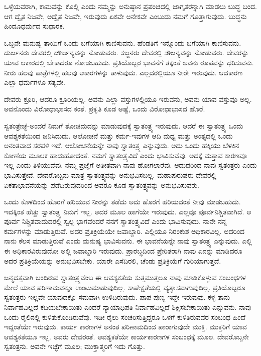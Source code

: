 ಒಳ್ಳೆಯವರಾಗಿ, ಕಾಮವನ್ನು ಕೊಲ್ಲಿ ಎಂದು ನಮ್ಮನ್ನು ಅನುಷ್ಠಾನ ಪ್ರಪಂಚದಲ್ಲಿ ಜಾಗೃತರನ್ನಾಗಿ ಮಾಡಲು ಬುದ್ಧ ಬಂದ. ಆಗ ದ್ವೈತ ನಿಜವೇ, ಅದ್ವೈತ ನಿಜವೇ, ಇರುವುದು ಏಕವೇ ಅನೇಕವೇ ಎಂಬುದು ನಮಗೆ ಗೊತ್ತಾಗುವುದು. ಬುದ್ಧನು ಹಿಂದೂಧರ್ಮದ ಸುಧಾರಕ.

ಒಬ್ಬನೇ ಮನುಷ್ಯ ತಾಯಿಗೆ ಒಂದು ಬಗೆಯಾಗಿ ಕಾಣಿಸುವನು. ಹೆಂಡತಿಗೆ ಇನ್ನೊಂದು ಬಗೆಯಾಗಿ ಕಾಣಿಸುವನು. ದುರ್ಜನರು ದೇವರಲ್ಲಿ ದೌರ್ಜನ್ಯವನ್ನು ನೋಡುವರು. ಸಜ್ಜನರು ದೇವರಲ್ಲಿ ಸೌಜನ್ಯವನ್ನು ನೋಡುವರು. ದೇವರನ್ನು ಯಾವ ಆಕಾರದಲ್ಲಿ ಬೇಕಾದರೂ ನೋಡಬಹುದು. ಪ್ರತಿಯೊಬ್ಬರ ಭಾವನೆಗೆ ತಕ್ಕಂತೆ ಅವನು ರೂಪವನ್ನು ಧರಿಸುವನು. ನೀರು ಹಲವು ಪಾತ್ರೆಗಳಲ್ಲಿ ಹಲವು ಆಕಾರಗಳನ್ನು ತಾಳುವುದು. ಎಲ್ಲದರಲ್ಲಿಯೂ ನೀರೇ ಇರುವುದು. ಆದಕಾರಣ ಎಲ್ಲಾ ಧರ್ಮಗಳೂ ಸತ್ಯವೇ.

ದೇವರು ಕ್ರೂರಿ, ಆದರೂ ಕ್ರೂರಿಯಲ್ಲ. ಅವನು ಎಲ್ಲಾ ವಸ್ತುಗಳಲ್ಲಿಯೂ ಇರುವನು, ಅವನು ಯಾವ ವಸ್ತುವೂ ಅಲ್ಲ. ಅವನೊಂದು ವಿರೋಧಾಭಾಸದ ಕಂತೆ. ಪ್ರಕೃತಿ ಕೂಡ ಅಷ್ಟೆ, ಒಂದು ವಿರೋಧಾಭಾಸದ ಹೊರೆ.

ಸ್ವತಂತ್ರೇಚ್ಛೆ-ಅಂದರೆ ನಿಮಗೆ ತೋಚಿದುದನ್ನು ಮಾಡುವುದಕ್ಕೆ ಸ್ವಾತಂತ್ರ್ಯ ಇರುವುದು. ಆದರೆ ಈ ಸ್ವಾತಂತ್ರ್ಯ ಒಂದು ಆವಶ್ಯಕತೆಯಿಂದ ಜನಿಸಿದುದು. ಆಲೋಚನೆ ಮತ್ತು ಕರ್ಮ-ಇವುಗಳ ಆದಿ ಮಧ್ಯ ಮತ್ತು ಅಂತ್ಯದಲ್ಲಿ ಒಂದು ಅನಂತವಾದ ಸರಪಳಿ ಇದೆ. ಆಲೋಚನೆಯನ್ನೇ ನಾವು ಸ್ವಾತಂತ್ರ್ಯ ಎನ್ನುವುದು. ಅದು ಒಂದು ಹಕ್ಕಿಯು ಬೆಳಕಿನ ಕೋಣೆಯ ಮೂಲಕ ಹಾದುಹೋದಂತೆ. ನಮಗೆ ಸ್ವಾತಂತ್ರ್ಯವಿದೆ ಎಂದು ಭಾವಿಸುವೆವು. ಅದಕ್ಕೆ ಮತ್ತಾವ ಕಾರಣವೂ ಇಲ್ಲ ಎಂದು ತಿಳಿಯುವೆವು. ನಮ್ಮ ಪ್ರಜ್ಞೆಗೆ ಅತೀತವಾಗಿ ನಾವು ಹೋಗಲಾರೆವು. ಆದುದರಿಂದ ನಾವು ಸ್ವತಂತ್ರರು ಎಂದು ಭಾವಿಸುತ್ತೇವೆ. ದೇವರೊಬ್ಬನು ಮಾತ್ರ ಸ್ವಾತಂತ್ರ್ಯವನ್ನು ಅನುಭವಿಸಬಲ್ಲ. ಮಹಾಪುರುಷರು ದೇವರಲ್ಲಿ ಏಕತಾಭಾವನೆಯನ್ನು ಪಡೆದಿರುವುದರಿಂದ ಅವರೂ ಕೂಡ ಸ್ವಾತಂತ್ರ್ಯವನ್ನು ಅನುಭವಿಸುವರು.

ಒಂದು ಕೊಳದಿಂದ ಹೊರಗೆ ಹರಿಯುವ ನೀರನ್ನು ತಡೆದು ಅದು ಹೊರಗೆ ಹರಿಯದಂತೆ ನೀವು ಮಾಡಬಹುದು. ಇದಕ್ಕಿಂತ ಹೆಚ್ಚು ಸ್ವಾತಂತ್ರ್ಯ ನಿಮಗೆ ಇಲ್ಲ. ಅದರ ಮೂಲ ಹಾಗೆಯೇ ಇರುವುದು. ಎಲ್ಲವೂ ಪೂರ್ವನಿಶ್ಚಿತವಾಗಿದೆ. ಆ ಪೂರ್ವ ನಿಶ್ಚಿತವಾದುದರಲ್ಲಿ ಸ್ವಲ್ಪ ಭಾಗವೆಂದರೆ ನನಗೆ ಸ್ವಾತಂತ್ರ್ಯವಿದೆ ಎಂದು ಭಾವಿಸುವುದು. ನಾನೇ ನನ್ನ ಕರ್ಮಗಳನ್ನು ಮಾಡುತ್ತಿರುವೆ. ಅದರ ಪ್ರತಿಕ್ರಿಯೆಯೇ ಜವಾಬ್ದಾರಿ. ಎಲ್ಲಿಯೂ ನಿರಂಕುಶ ಅಧಿಕಾರವಿಲ್ಲ. ಅದರಿಂದ ನಾನು ಕೆಲಸ ಮಾಡುತ್ತಿರುವೆ ಎಂದು ಮನುಷ್ಯ ಭಾವಿಸುವನು. ಈ ಭಾವನೆಯನ್ನೇ ನಾವು ಸ್ವಾತಂತ್ರ್ಯ ಎನ್ನುವುದು. ಎಲ್ಲಿ ಈ ಅಧಿಕಾರವಿರುವುದೋ ಅಲ್ಲಿ ಜವಾಬ್ದಾರಿ ಇರುವುದು. ಪ್ರಾರಬ್ಧದಿಂದ ಪ್ರೇರಿತರಾಗಿ ನಾವು ಏನನ್ನು ಮಾಡಿದರೂ ಅದರ ಪ್ರತಿಕ್ರಿಯೆಯನ್ನು ಅನುಭವಿಸಬೇಕು. ಯಾರೇ ಎಸೆದಿರಲಿ, ಚೆಂಡು ಪ್ರತಿಕ್ರಿಯೆಗೆ ಗುರಿಯಾಗುತ್ತದೆ.

ಜನ್ಮದತ್ತವಾಗಿ ಬಂದಿರುವ ಸ್ವಾತಂತ್ರ್ಯವೆಂಬ ಈ ಆವಶ್ಯಕತೆಯ ಸುತ್ತಮುತ್ತಲೂ ನಾವು ಮಾಡಿಕೊಳ್ಳುವ ಸಂಬಂಧಗಳ ಮೇಲೆ ಯಾವ ಪರಿಣಾಮವನ್ನೂ ಉಂಟುಮಾಡುವುದಿಲ್ಲ. ಸಾಪೇಕ್ಷತೆಯಲ್ಲಿ ವ್ಯತ್ಯಾಸವಾಗುವುದಿಲ್ಲ. ಪ್ರತಿಯೊಬ್ಬರೂ ಸ್ವತಂತ್ರರು ಇಲ್ಲವೇ ಯಾವುದಕ್ಕೊ ಸಮವಾಗಿ ಉಳಿದಿರುವುದು. ಪಾಪ ಪುಣ್ಯ ಇದ್ದೇ ಇರುವುವು. ಕಳ್ಳ ತಾನು ನಿರ್ವಾಹವಿಲ್ಲದೆ ಕದಿಯಬೇಕಾಯಿತು ಎಂದರೆ ನ್ಯಾಯಾಧಿಪತಿ ನಿರ್ವಾಹವಿಲ್ಲದೆ ಶಿಕ್ಷಿಸಬೇಕಾಯಿತು ಎನ್ನುವನು. ನಾವು ಒಂದು ರೈಲಿನಲ್ಲಿ ಕುಳಿತುಕೊಂಡಿರುವೆವು. ಇಡೀ ರೈಲು ಸಂಚರಿಸುತ್ತಿದ್ದರೂ ಒಳಗೆ ಕುಳಿತಿರುವವರ ಸಂಬಂಧ ಹಿಂದೆ ಇದ್ದಂತೆಯೇ ಇರುವುದು. ಕಾರ್ಯ ಕಾರಣಗಳ ಅನಂತ ಪರಿಣಾಮದಿಂದ ಪಾರಾಗುವುದೇ ಮುಕ್ತಿ. ಮುಕ್ತರಿಗೆ ಯಾವ ಆವಶ್ಯಕತೆಯೂ ಇಲ್ಲ. ಅವರು ದೇವರಂತೆ. ಆವಶ್ಯಕತೆಯೇ ಕಾರ್ಯಕಾರಣಗಳ ಸಂಬಂಧಕ್ಕೆ ಮೂಲ. ದೇವರೊಬ್ಬನೇ ಸ್ವತಂತ್ರನು. ಅವನೇ ಇಚ್ಛೆಗೆ ಮೂಲ; ಮುಕ್ತಾತ್ಮರಿಗೆ ಇದು ಗೊತ್ತು.

